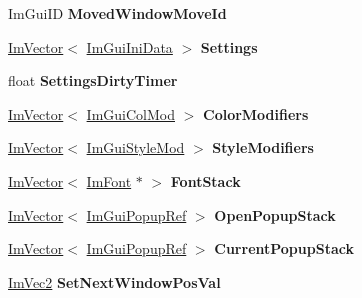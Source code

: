 \begin{DoxyCompactItemize}
Im\+Gui\+ID {\bfseries Moved\+Window\+Move\+Id}
\item 
\mbox{\label{struct_im_gui_context_ad7786303f4a54b3dc702e4e646a10bad}} 
\hyperlink{class_im_vector}{Im\+Vector}$<$ \hyperlink{struct_im_gui_ini_data}{Im\+Gui\+Ini\+Data} $>$ {\bfseries Settings}
\item 
\mbox{\label{struct_im_gui_context_a7e0dd3aef4a4f0fd85ed39e13824f2ab}} 
float {\bfseries Settings\+Dirty\+Timer}
\item 
\mbox{\label{struct_im_gui_context_aeb58091b545cc794c99487b8e66daf43}} 
\hyperlink{class_im_vector}{Im\+Vector}$<$ \hyperlink{struct_im_gui_col_mod}{Im\+Gui\+Col\+Mod} $>$ {\bfseries Color\+Modifiers}
\item 
\mbox{\label{struct_im_gui_context_ac0feba14c36c7dff87211c3650815be7}} 
\hyperlink{class_im_vector}{Im\+Vector}$<$ \hyperlink{struct_im_gui_style_mod}{Im\+Gui\+Style\+Mod} $>$ {\bfseries Style\+Modifiers}
\item 
\mbox{\label{struct_im_gui_context_a8a6a9f23604fe0d0b51c78e45e4432b0}} 
\hyperlink{class_im_vector}{Im\+Vector}$<$ \hyperlink{struct_im_font}{Im\+Font} $\ast$ $>$ {\bfseries Font\+Stack}
\item 
\mbox{\label{struct_im_gui_context_af6c0e07cff9641d31bdf22b7e7df2842}} 
\hyperlink{class_im_vector}{Im\+Vector}$<$ \hyperlink{struct_im_gui_popup_ref}{Im\+Gui\+Popup\+Ref} $>$ {\bfseries Open\+Popup\+Stack}
\item 
\mbox{\label{struct_im_gui_context_a7b2472ca52bcccb98e0db1a8b1b78853}} 
\hyperlink{class_im_vector}{Im\+Vector}$<$ \hyperlink{struct_im_gui_popup_ref}{Im\+Gui\+Popup\+Ref} $>$ {\bfseries Current\+Popup\+Stack}
\item 
\mbox{\label{struct_im_gui_context_a8cb5445e4f740af210aa1794707dffbc}} 
\hyperlink{struct_im_vec2}{Im\+Vec2} {\bfseries Set\+Next\+Window\+Pos\+Val}
\item 
\mbox{\label{struct_im_gui_context_a0da8611453fefe211a63abce142f9d74}} 

\end{DoxyCompactItemize}
